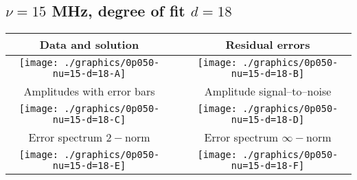 

% 

\clearpage{}
\break{}

\subsection{$\nu = 15$ MHz, degree of fit $d = 18$}

\begin{table}[h]
    \begin{center}
        \begin{tabular}{ccc}
            Data and solution & \quad & Residual errors \\\hline
            \texttt{[image: ./graphics/0p050-nu=15-d=18-A]} &&
            \texttt{[image: ./graphics/0p050-nu=15-d=18-B]} \\[15pt]
            Amplitudes with error bars && Amplitude signal--to--noise \\\hline
            \texttt{[image: ./graphics/0p050-nu=15-d=18-C]} &&
            \texttt{[image: ./graphics/0p050-nu=15-d=18-D]} \\[15pt]
            Error spectrum $2-$norm && Error spectrum $\infty-$norm \\\hline
            \texttt{[image: ./graphics/0p050-nu=15-d=18-E]} &&
            \texttt{[image: ./graphics/0p050-nu=15-d=18-F]} \\[15pt]
        \end{tabular}
    \end{center}
\label{fig:elev=50, nu=15}
\end{table}



\endinput
